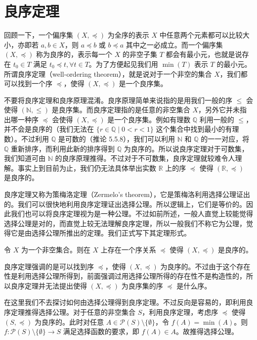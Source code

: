 \section{良序定理}

回顾一下，一个偏序集 $(X, \preceq)$ 为全序的表示 $X$ 中任意两个元素都可以比较大小，亦即若 $a, b \in X$，则 $a \preceq b$ 或 $b \preceq a$ 其中之一必成立。而一个偏序集 $(X, \preceq)$ 称为良序的，表示每一个 $X$ 的非空子集 $T$ 都会有最小元，也就是说存在 $t_0 \in T$ 满足 $t_0 \preceq t, \forall t \in T$。为了方便起见我们用 $\min(T)$ 表示 $T$ 的最小元。所谓良序定理（well-ordering theorem），就是说对于一个非空的集合 $X$，我们都可以找到一个序 $\preceq$，使得 $(X, \preceq)$ 是一个良序集。

不要将良序定理和良序原理混淆。良序原理简单来说指的是用我们一般的序 $\leq$ 会使得 $(\mathbb{N}, \leq)$ 是良序集。而良序定理指的是任意的非空集合 $X$，另外它并未指出哪一种序 $\preceq$ 会使得 $(X, \preceq)$ 是一个良序集。例如有理数 $\mathbb{Q}$ 利用一般的 $\leq$，并不会是良序的（我们无法在 $\{r \in \mathbb{Q} \mid 0 < r < 1\}$ 这个集合中找到最小的有理数）。不过利用 $\mathbb{Q}$ 是可数的（推论 5.5.8），我们可以利用 $\mathbb{N}$ 和 $\mathbb{Q}$ 的一一对应，将 $\mathbb{Q}$ 重新排序，而利用此新的排序得到 $\mathbb{Q}$ 为良序的。所以说良序定理对于可数集，我们知道可由 $\mathbb{N}$ 的良序原理推得。不过对于不可数集，良序定理就较难令人理解。事实上到目前为止，我们仍无法具体举出实数 $\mathbb{R}$ 上的序 $\preceq$ 使得 $(\mathbb{R}, \preceq)$ 是良序的。

良序定理又称为策梅洛定理（Zermelo's theorem），它是策梅洛利用选择公理证出的。我们可以很快地利用良序定理证出选择公理。所以逻辑上，它们是等价的。因此我们也可以将良序定理视为是一种公理。不过如前所述，一般人直觉上较能觉得选择公理是对的，而直觉上较无法理解良序定理，所以一般我们不称它为公理，觉得它是由选择公理所推出的定理。我们正式写下其定理形式。

\begin{theorem}[良序定理]
令 $X$ 为一个非空集合。则在 $X$ 上存在一个序关系 $\preceq$ 使得 $(X, \preceq)$ 是良序的。
\end{theorem}

良序定理强调的是可以找到序 $\preceq$，使得 $(X, \preceq)$ 为良序的。不过由于这个存在性是利用选择公理所得到，前面强调过用选择公理所得的存在性不是构造性的，所以良序定理并无法提出使得 $(X, \preceq)$ 为良序集的序 $\preceq$ 是什么序。

在这里我们不去探讨如何由选择公理得到良序定理。不过反向是容易的，即利用良序定理推得选择公理。对于任意的非空集合 $S$，利用良序定理，考虑序 $\preceq$ 使得 $(S, \preceq)$ 为良序的。此时对任意 $A \in \mathcal{P}(S) \setminus \{\emptyset\}$，令 $f(A) = \min(A)$。则 $f : \mathcal{P}(S) \setminus \{\emptyset\} \to S$ 满足选择函数的要求，即 $f(A) \in A$。故推得选择公理。

